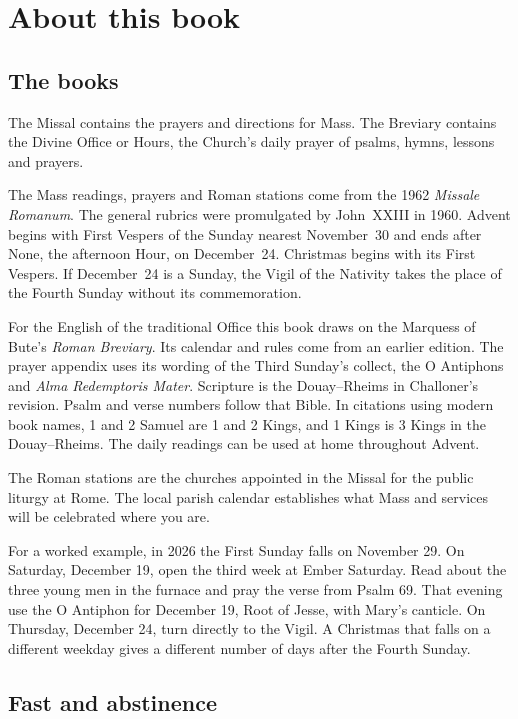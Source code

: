 \section{About this book}

\subsection{The books}

The Missal contains the prayers and directions for Mass. The Breviary
contains the Divine Office or Hours, the Church's daily prayer of psalms,
hymns, lessons and prayers.

The Mass readings, prayers and Roman stations come from the 1962
\textit{Missale Romanum}. The general rubrics were promulgated by John~XXIII
in 1960. Advent begins with First Vespers of the Sunday nearest November~30
and ends after None, the afternoon Hour, on December~24. Christmas begins
with its First Vespers. If December~24 is a Sunday, the Vigil of the
Nativity takes the place of the Fourth Sunday without its commemoration.

For the English of the traditional Office this book draws on the
Marquess of Bute's \textit{Roman Breviary}. Its calendar and rules come
from an earlier edition. The prayer appendix uses its wording of
the Third Sunday's collect, the O Antiphons and
\textit{Alma Redemptoris Mater}. Scripture is the
Douay--Rheims in Challoner's revision. Psalm and verse numbers follow that
Bible. In citations using modern book names, 1 and 2 Samuel are 1 and 2 Kings,
and 1 Kings is 3 Kings in the Douay--Rheims. The daily readings can be used
at home throughout Advent.

The Roman stations are the churches appointed in the Missal for the
public liturgy at Rome. The local parish calendar establishes what Mass
and services will be celebrated where you are.

For a worked example, in 2026 the First Sunday falls on November 29.
On Saturday, December 19, open the third week at Ember Saturday. Read
about the three young men in the furnace and pray the verse from Psalm 69.
That evening use the O Antiphon for December 19, Root of Jesse, with
Mary's canticle. On Thursday, December 24, turn directly to the Vigil.
A Christmas that falls on a different weekday gives a different number
of days after the Fourth Sunday.

\subsection{Fast and abstinence}

